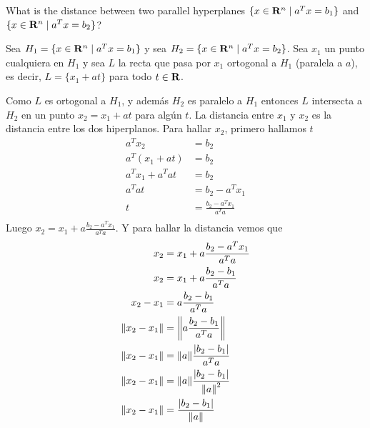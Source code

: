 
\begin{enunciado}{2.5}
What is the distance between two parallel hyperplanes
$\{x \in \mathbf{R}^n \mid a^Tx = b_1\}$ and
$\{x \in \mathbf{R}^n \mid a^Tx = b_2\}$?
\end{enunciado}

Sea $H_1 = \{x \in \mathbf{R}^n \mid a^Tx = b_1\}$ y sea  $H_2 = \{x \in \mathbf{R}^n \mid a^Tx = b_2\}$.
Sea $x_1$ un punto cualquiera en $H_1$ y sea $L$ la recta que pasa por $x_1$ ortogonal a $H_1$ (paralela a $a$),
es decir, $L = \{x_1+at\}$ para todo $t\in\mathbf{R}$.

Como $L$ es ortogonal a $H_1$, y además $H_2$ es paralelo a $H_1$ entonces $L$ intersecta
a $H_2$ en un punto $x_2 = x_1 + at$ para algún $t$. La distancia entre $x_1$ y $x_2$ es 
la distancia entre los dos hiperplanos.
Para hallar $x_2$, primero hallamos $t$
\begin{align*}
    a^Tx_2 &= b_2 \\
    a^T(x_1 + at) &= b_2 \\
    a^Tx_1 + a^Tat &= b_2 \\
    a^Tat &= b_2 - a^Tx_1 \\
    t &= \frac{b_2 - a^Tx_1}{a^Ta} \\
\end{align*}
Luego $x_2 = x_1 + a\frac{b_2 - a^Tx_1}{a^Ta}$. Y para hallar la distancia vemos que
\begin{align*}
    x_2 &= x_1 + a\frac{b_2 - a^Tx_1}{a^Ta} \\
    x_2 &= x_1 + a\frac{b_2 - b_1}{a^Ta} \\
    x_2 - x_1  &= a\frac{b_2 - b_1}{a^Ta} \\
    \norm{x_2 - x_1}  &= \norm{a\frac{b_2 - b_1}{a^Ta}} \\
    \norm{x_2 - x_1}  &= \norm{a}\frac{\abs{b_2 - b_1}}{a^Ta} \\
    \norm{x_2 - x_1}  &= \norm{a}\frac{\abs{b_2 - b_1}}{\norm{a}^2} \\
    \norm{x_2 - x_1}  &= \frac{\abs{b_2 - b_1}}{\norm{a}}
\end{align*}

